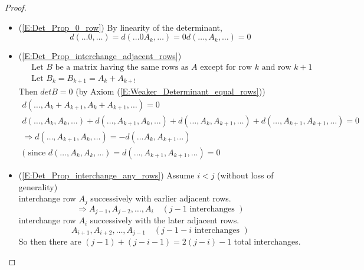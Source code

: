 \documentclass[twoside]{amsart}
\theoremstyle{plain}
\theoremstyle{definition}
\begin{document}
\begin{proof} \quad \\
  \begin{itemize}
  \item (\ref{E:Det_Prop_0_row}) By linearity of the determinant, 
\[
d( \dots 0 , \dots ) = d( \dots 0 A_k , \dots ) = 0 d(\dots , A_k , \dots ) = 0 
\] 
  \item (\ref{E:Det_Prop_interchange_adjacent_rows}) 
    \begin{align*}
      & \text{ Let $B$ be a matrix having the same rows as $A$ except for row $k$ and row $k+1$ } \\
      & \text{ Let } B_k = B_{k+1} = A_k + A_{k+!} 
    \end{align*} 
    Then $det B =0$ (by Axiom (\ref{E:Weaker_Determinant_equal_rows})) 
    \begin{gather*}
      d(\dots , A_k + A_{k+1} , A_k + A_{k+1} , \dots ) =0 \\
      d(\dots , A_k , A_k , \dots ) + d(\dots , A_{k+1} , A_k , \dots ) + d(\dots , A_k , A_{k+1} , \dots ) + d(\dots , A_{k+1} , A_{k+1} , \dots ) = 0 \\
      \Longrightarrow d(\dots , A_{k+1} , A_k , \dots ) = -d(\dots A_k , A_{k+1} \dots ) \\
      ( \text{ since } d(\dots , A_k , A_k , \dots ) = d(\dots , A_{k+1} , A_{k+1} , \dots ) = 0 
    \end{gather*}
  \item (\ref{E:Det_Prop_interchange_any_rows}) Assume $i<j$ (without loss of generality) \\
    interchange row $A_j$ successively with earlier adjacent rows.  \\
    \[
    \Longrightarrow A_{j-1} , A_{j-2} , \dots , A_i \quad ( j-1 \text{ interchanges } ) 
    \]
    interchange row $A_i$ successively with the later adjacent rows.  
    \[
    A_{i+1} , A_{i+2} , \dots , A_{j-1} \quad (j-1-i \text{ interchanges } ) 
    \]
    So then there are $(j-1) + (j-i-1) = 2 (j-i) -1 $ total interchanges.  
    

\end{itemize}
\end{proof}
\end{document}
